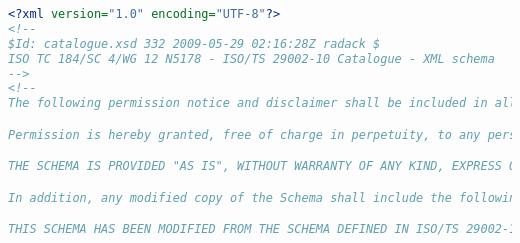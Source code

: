  \begin{lstlisting}[caption=catalogue.xsd, language=XML, label=lst:catalogue_xsd]
<?xml version="1.0" encoding="UTF-8"?>
<!--
$Id: catalogue.xsd 332 2009-05-29 02:16:28Z radack $
ISO TC 184/SC 4/WG 12 N5178 - ISO/TS 29002-10 Catalogue - XML schema
-->
<!--
The following permission notice and disclaimer shall be included in all copies of this XML schema ("the Schema"), and derivations of the Schema:

Permission is hereby granted, free of charge in perpetuity, to any person obtaining a copy of the Schema, to use, copy, modify, merge and distribute free of charge, copies of the Schema for the purposes of developing, implementing, installing and using software based on the  Schema, and to permit persons to whom the Schema is furnished to do so, subject to the following conditions:

THE SCHEMA IS PROVIDED "AS IS", WITHOUT WARRANTY OF ANY KIND, EXPRESS OR IMPLIED, INCLUDING BUT NOT LIMITED TO THE WARRANTIES OF MERCHANTABILITY, FITNESS FOR A PARTICULAR PURPOSE AND NONINFRINGEMENT. IN NO EVENT SHALL THE AUTHORS OR COPYRIGHT HOLDERS BE LIABLE FOR ANY CLAIM, DAMAGES OR OTHER LIABILITY, WHETHER IN AN ACTION OF CONTRACT, TORT OR OTHERWISE, ARISING FROM, OUT OF OR IN CONNECTION WITH THE SCHEMA OR THE USE OR OTHER DEALINGS IN THE SCHEMA.

In addition, any modified copy of the Schema shall include the following notice:

THIS SCHEMA HAS BEEN MODIFIED FROM THE SCHEMA DEFINED IN ISO/TS 29002-10, AND SHOULD NOT BE INTERPRETED AS COMPLYING WITH THAT STANDARD.


\end{lstlisting}
